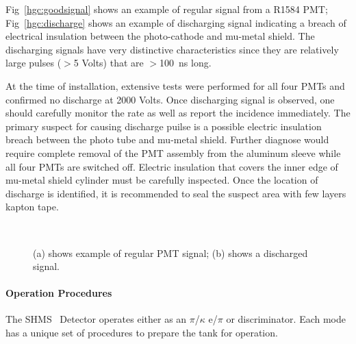 {%

Fig~\ref{hgc:goodsignal} shows an example of regular signal from a
R1584 PMT; Fig~\ref{hgc:discharge} shows an example of discharging
signal indicating a breach of electrical insulation between the
photo-cathode and mu-metal shield. The discharging signals have very
distinctive characteristics since they are relatively large pulses
($>$5 Volts) that are $>$100~ns long.

At the time of installation, extensive tests were performed for all
four PMTs and confirmed no discharge at 2000 Volts. Once discharging
signal is observed, one should carefully monitor the rate as well as
report the incidence immediately. The primary suspect for causing
discharge puilse is a possible electric insulation breach between the
photo tube and mu-metal shield. Further diagnose would require
complete removal of the PMT assembly from the aluminum sleeve while
all four PMTs are switched off. Electric insulation that covers the
inner edge of mu-metal shield cylinder must be carefully
inspected. Once the location of discharge is identified, it is
recommended to seal the suspect area with few layers kapton tape.







\begin{figure}
     \centering
     ~
     \caption{(a) shows example of regular PMT signal; (b) shows a discharged signal.}
     \label{hgc:signal}
\end{figure}


% 
% 
% 






{\color{red}


\paragraph{Operation Procedures}
% 
% 
The SHMS \Cerenkov\ Detector operates either as an $\pi$/$\kappa$ e/$\pi$ or
discriminator. Each mode has a unique set of procedures to prepare the tank
for operation. 


}}
